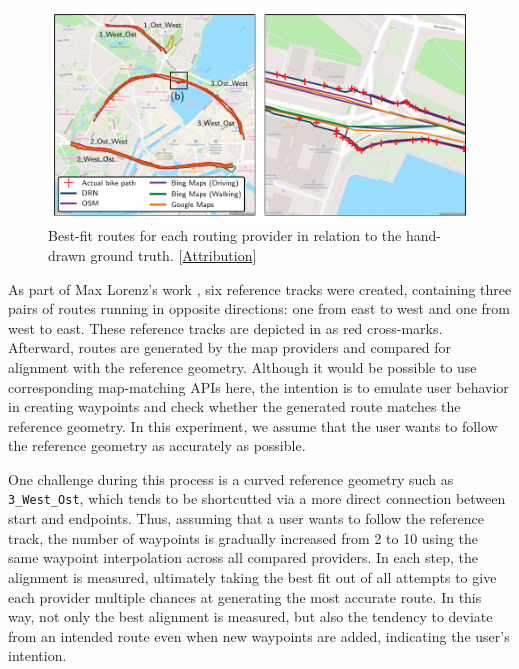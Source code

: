 \begin{figure}[t]
\centering 
\includegraphics[width=\linewidth]{images/routing-hand-drawn-ground-truth.pdf}
\caption{Best-fit routes for each routing provider in relation to the hand-drawn ground truth. [\hyperref[attribution]{Attribution}]}
\label{fig:routing-hand-drawn-ground-truth}
\end{figure}

As part of Max Lorenz's work \cite{lorenz_2022}, six reference tracks were created, containing three pairs of routes running in opposite directions: one from east to west and one from west to east. These reference tracks are depicted in  as red cross-marks. Afterward, routes are generated by the map providers and compared for alignment with the reference geometry. Although it would be possible to use corresponding map-matching APIs here, the intention is to emulate user behavior in creating waypoints and check whether the generated route matches the reference geometry. In this experiment, we assume that the user wants to follow the reference geometry as accurately as possible.

One challenge during this process is a curved reference geometry such as \texttt{3\_West\_Ost}, which tends to be shortcutted via a more direct connection between start and endpoints. Thus, assuming that a user wants to follow the reference track, the number of waypoints is gradually increased from 2 to 10 using the same waypoint interpolation across all compared providers. In each step, the alignment is measured, ultimately taking the best fit out of all attempts to give each provider multiple chances at generating the most accurate route. In this way, not only the best alignment is measured, but also the tendency to deviate from an intended route even when new waypoints are added, indicating the user's intention.

